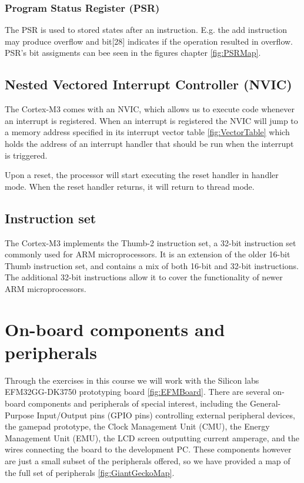 \subsubsection{Program Status Register (PSR)}
The PSR is used to stored states after an instruction. E.g. the add instruction may produce overflow and bit[28] indicates if the operation resulted in overflow. PSR's bit assigments can bee seen in the figures chapter \ref{fig:PSRMap}.

\subsection{Nested Vectored Interrupt Controller (NVIC)}
The Cortex-M3 comes with an NVIC, which allows us to execute code whenever an interrupt is registered. When an interrupt is registered the NVIC will jump to a memory address specified in its interrupt vector table \ref{fig:VectorTable} which holds the address of an interrupt handler that should be run when the interrupt is triggered.

Upon a reset, the processor will start executing the reset handler in handler mode. When the reset handler returns, it will return to thread mode.


\subsection{Instruction set}
The Cortex-M3 implements the Thumb-2 instruction set, a 32-bit instruction set commonly used for ARM microprocessors. It is an extension of the older 16-bit Thumb instruction set, and contains a mix of both 16-bit and 32-bit instructions. The additional 32-bit instructions allow it to cover the functionality of newer ARM microprocessors.\cite{CortexA8-RM}



\section{On-board components and peripherals}

Through the exercises in this course we will work with the  Silicon labs EFM32GG-DK3750 prototyping board \ref{fig:EFMBoard}. There are several on-board components and peripherals of special interest, including the General-Purpose Input/Output pins (GPIO pins) controlling external peripheral devices, the gamepad prototype, the Clock Management Unit (CMU), the Energy Management Unit (EMU), the LCD screen outputting current amperage, and the wires connecting the board to the development PC. These components however are just a small subset of the peripherals offered, so we have provided a map of the full set of peripherals \ref{fig:GiantGeckoMap}.

